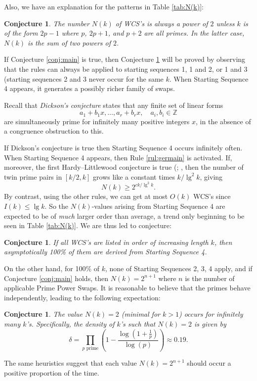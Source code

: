 \documentclass{article}
\newtheorem{conjecture}[theorem]{Conjecture}
\theoremstyle{definition}
\theoremstyle{remark}
\numberwithin{equation}{section}
\numberwithin{case}{theorem}
\begin{document}
Also, we have an explanation for the patterns in Table \ref{tab:N(k)}:
\begin{conjecture}\label{conj:power of 2}
  The number $N(k)$ of WCS's is always a power of $2$ unless $k$ is of the form $2p - 1$ where $p$, $2p + 1$, and $p + 2$ are all primes. In the latter case, $N(k)$ is the sum of two powers of $2$.
\end{conjecture}
If Conjecture \ref{conj:main} is true, then Conjecture \ref{conj:power of 2} will be proved by observing that the rules can always be applied to starting sequences 1, 1 and 2, or 1 and 3 (starting sequences 2 and 3 never occur for the same $k$. When Starting Sequence 4 appears, it generates a possibly richer family of swaps.

Recall that \emph{Dickson's conjecture} \cite{Dickson,Prime,BatemanHorn} states that any finite set of linear forms
\[
  a_1 + b_1 x, \ldots, a_r + b_r x, \quad a_i, b_i \in \mathbb{Z}
\]
are simultaneously prime for infinitely many positive integers $x$, in the absence of a congruence obstruction to this.

If Dickson's conjecture is true then Starting Sequence 4 occurs infinitely often. When Starting Sequence 4 appears, then Rule \ref{rul:germain} is activated. If, moreover, the first Hardy–Littlewood conjecture is true (\cite{HardyLittlewood}; \cite[\textsection A9]{Guy}, then the number of twin prime pairs in $[k/2, k]$ grows like a constant times $k/\lg^2 k$, giving
\[
  N(k) \geq 2^{c k/\lg^2 k}.
\]
By contrast, using the other rules, we can get at most $O(k)$ WCS's since $I(k) \leq \lg k$. So the $N(k)$-values arising from Starting Sequence 4 are expected to be of \emph{much} larger order than average, a trend only beginning to be seen in Table \ref{tab:N(k)}. We are thus led to conjecture:
\begin{conjecture}
  If all WCS's are listed in order of increasing length $k$, then asymptotically 100\% of them are derived from Starting Sequence 4.
\end{conjecture}

On the other hand, for 100\% of $k$, none of Starting Sequences 2, 3, 4 apply, and if Conjecture \ref{conj:main} holds, then $N(k) = 2^{n+1}$ where $n$ is the number of applicable Prime Power Swaps. It is reasonable to believe that the primes behave independently, leading to the following expectation:
\begin{conjecture}
    The value $N(k) = 2$ (minimal for $k > 1$) occurs for infinitely many $k$'s. Specifically, the density of $k$'s such that $N(k) = 2$ is given by
    \[
      \delta = \prod_{p \text{ prime}} \left(1 - \frac{\log\left(1 + \frac{1}{p}\right)}{\log(p)}\right) \approx 0.19.
    \]
\end{conjecture}
The same heuristics suggest that each value $N(k) = 2^{n+1}$ should occur a positive proportion of the time.
\end{document}
